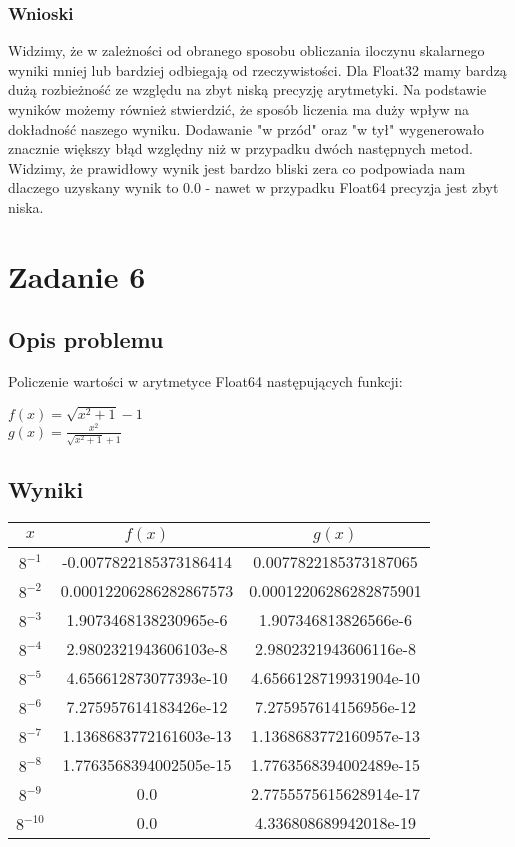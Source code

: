 \documentclass{article}
\begin{document}
\subsubsection{Wnioski}
    Widzimy, że w zależności od obranego sposobu obliczania iloczynu skalarnego wyniki mniej lub bardziej odbiegają od rzeczywistości.
    Dla Float32 mamy bardzą dużą rozbieżność ze względu na zbyt niską precyzję arytmetyki. Na podstawie wyników możemy również stwierdzić, że sposób liczenia ma duży wpływ na dokładność naszego wyniku.
    Dodawanie "w przód" oraz "w tył" wygenerowało znacznie większy błąd względny niż w przypadku dwóch następnych metod. Widzimy, że prawidłowy wynik jest bardzo bliski zera co podpowiada nam dlaczego uzyskany wynik to 0.0 - nawet w przypadku Float64 precyzja jest zbyt niska.

\section{Zadanie 6}
\subsection{Opis problemu}
    Policzenie wartości w arytmetyce Float64 następujących funkcji:\\
    \begin{center}
        $f(x)=\sqrt{x^2 + 1} - 1$\\ $g(x)=\frac{x^2}{\sqrt{x^2 +1}+1}$
    \end{center}
\subsection{Wyniki}
        \begin{center}
        \begin{tabular}{|c||c|c|}
        \hline
            $x$ & $f(x)$ & $g(x)$ \\
            \hline\hline
            $8^{-1}$ & -0.0077822185373186414 & 0.0077822185373187065 \\
            \hline
            $8^{-2}$ & 0.00012206286282867573 & 0.00012206286282875901\\
            \hline
            $8^{-3}$ & 1.9073468138230965e-6 & 1.907346813826566e-6\\
            \hline
            $8^{-4}$ & 2.9802321943606103e-8 & 2.9802321943606116e-8\\
            \hline
            $8^{-5}$ & 4.656612873077393e-10 & 4.6566128719931904e-10\\
            \hline
            $8^{-6}$ & 7.275957614183426e-12 & 7.275957614156956e-12\\
            \hline
            $8^{-7}$ & 1.1368683772161603e-13 & 1.1368683772160957e-13\\
            \hline
            $8^{-8}$ & 1.7763568394002505e-15 & 1.7763568394002489e-15\\
            \hline
            $8^{-9}$ & 0.0 & 2.7755575615628914e-17\\
            \hline
            $8^{-10}$ & 0.0 & 4.336808689942018e-19\\
        \hline
        \end{tabular}
    \end{center}
\end{document}
